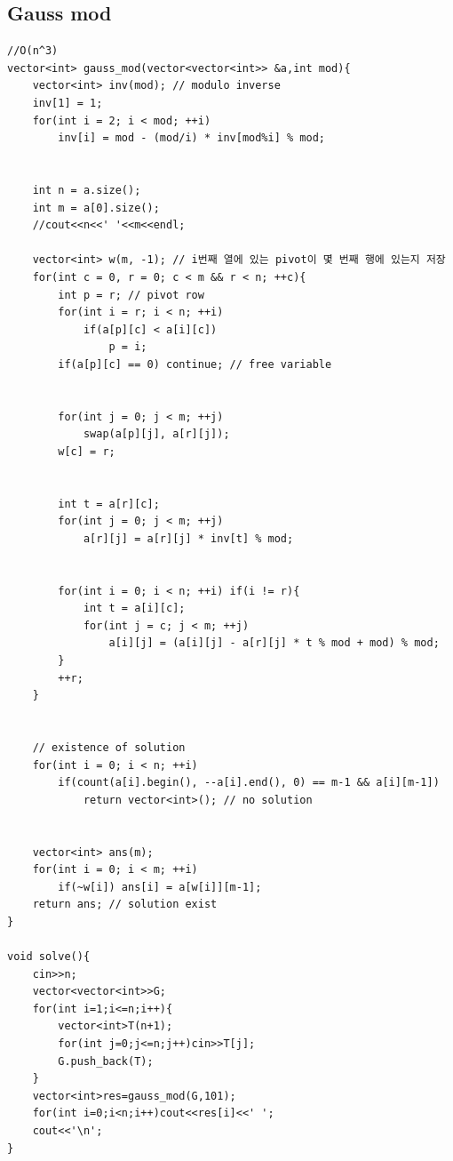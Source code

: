 \documentclass[landscape, 8pt, a4paper, oneside, twocolumn]{extarticle}
\begin{document}
\subsection{Gauss mod}
\begin{verbatim}
//O(n^3)
vector<int> gauss_mod(vector<vector<int>> &a,int mod){
    vector<int> inv(mod); // modulo inverse
    inv[1] = 1;
    for(int i = 2; i < mod; ++i)
        inv[i] = mod - (mod/i) * inv[mod%i] % mod;


    int n = a.size();
    int m = a[0].size();
    //cout<<n<<' '<<m<<endl;

    vector<int> w(m, -1); // i번째 열에 있는 pivot이 몇 번째 행에 있는지 저장
    for(int c = 0, r = 0; c < m && r < n; ++c){
        int p = r; // pivot row
        for(int i = r; i < n; ++i)
            if(a[p][c] < a[i][c])
                p = i;
        if(a[p][c] == 0) continue; // free variable


        for(int j = 0; j < m; ++j)
            swap(a[p][j], a[r][j]);
        w[c] = r;


        int t = a[r][c];
        for(int j = 0; j < m; ++j)
            a[r][j] = a[r][j] * inv[t] % mod;


        for(int i = 0; i < n; ++i) if(i != r){
            int t = a[i][c];
            for(int j = c; j < m; ++j)
                a[i][j] = (a[i][j] - a[r][j] * t % mod + mod) % mod;
        }
        ++r;
    }


    // existence of solution
    for(int i = 0; i < n; ++i)
        if(count(a[i].begin(), --a[i].end(), 0) == m-1 && a[i][m-1])
            return vector<int>(); // no solution


    vector<int> ans(m);
    for(int i = 0; i < m; ++i)
        if(~w[i]) ans[i] = a[w[i]][m-1];
    return ans; // solution exist
}

void solve(){
    cin>>n;
    vector<vector<int>>G;
    for(int i=1;i<=n;i++){
        vector<int>T(n+1);
        for(int j=0;j<=n;j++)cin>>T[j];
        G.push_back(T);
    }
    vector<int>res=gauss_mod(G,101);
    for(int i=0;i<n;i++)cout<<res[i]<<' ';
    cout<<'\n';
}
\end{verbatim}
\end{document}
